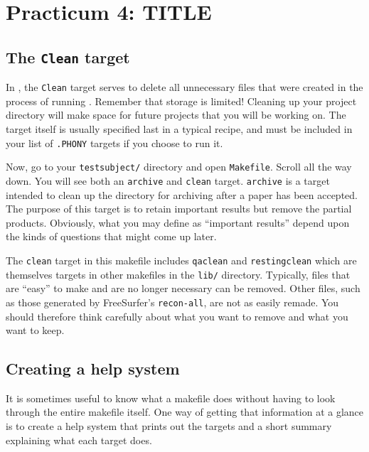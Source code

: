 \chapter*{Practicum 4: TITLE } %
\label{sec:practicum4}

\section{The \texttt{Clean} target}
In \maken{}, the \texttt{Clean} target serves to delete all unnecessary files that were created in the process of running \maken{}. Remember that storage is limited! Cleaning up your project directory will make space for future projects that you will be working on. The target itself is usually specified last in a typical \maken{} recipe, and must be included in your list of \texttt{.PHONY} targets if you choose to run it. 

Now, go to your \texttt{testsubject/} directory and open \texttt{Makefile}. Scroll all the way down. You will see both an \texttt{archive} and \texttt{clean} target. \texttt{archive} is a target intended to clean up the directory for archiving after a paper has been accepted. The purpose of this target is to retain important results but remove the partial products. Obviously, what you may define as ``important results'' depend upon the kinds of questions that might come up later. 


The \texttt{clean} target in this makefile includes \texttt{qaclean} and \texttt{restingclean} which are themselves targets in other makefiles in the \texttt{lib/} directory. Typically, files that are ``easy'' to make and are no longer necessary can be removed. Other files, such as those generated by FreeSurfer's \texttt{recon-all}, are not as easily remade. You should therefore think carefully about what you want to remove and what you want to keep.  

\section{Creating a \maken{} help system}
It is sometimes useful to know what a makefile does without having to look through the entire makefile itself. One way of getting that information at a glance is to create a \maken{} help system that prints out the targets and a short summary explaining what each target does. 

